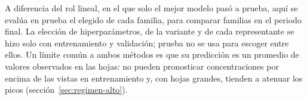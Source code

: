 A diferencia del rol lineal, en el que solo el mejor modelo pasó a prueba, aquí se evalúa en prueba el elegido de cada familia, para comparar familias en el periodo final. La elección de hiperparámetros, de la variante y de cada representante se hizo solo con entrenamiento y validación; prueba no se usa para escoger entre ellos. Un límite común a ambos métodos es que su predicción es un promedio de valores observados en las hojas: no pueden pronosticar concentraciones por encima de las vistas en entrenamiento y, con hojas grandes, tienden a atenuar los picos (sección~\ref{sec:regimen-alto}).
